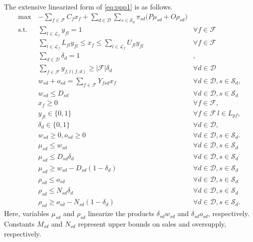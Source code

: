 \documentclass[12pt]{article}
\theoremstyle{thmstylethree}%
\begin{document}
\begin{appendices}
The extensive linearized form of \eqref{eq:ppp1} is as follows.
\begin{subequations}
\begin{align}
\max~&-\sum_{f\in\mathcal{F}}C_{f}x_{f}+\sum_{d\in\mathcal{D}}\sum_{s\in\mathcal{S}_{d}}\pi_{sd}\bigg(P \mu_{sd}+O\rho_{sd}\bigg)\\
\text{s.t. }~&   \sum_{l\in\mathcal{L}_{f}}y_{fl} =1&\forall f\in\mathcal{F}  \\
&   \sum_{l\in\mathcal{L}_{f}}L_{fl}y_{fl} \leq x_{f}\leq \sum_{l\in\mathcal{L}_{f}}U_{fl}y_{fl}&\forall f\in\mathcal{F}\\ 
  & \sum_{d\in\mathcal{D}}\delta_{d} = 1 & , \\
 &\sum_{f\in\mathcal{F}}y_{f,l(f,d)}\geq |\mathcal{F}|\delta_{d} &\forall  d\in \mathcal{D}\\
&w_{sd} + o_{sd}= \sum_{f\in\mathcal{F}}Y_{fsd}x_{f} & \forall  d\in\mathcal{D}, s\in\mathcal{S}_{d}, \\
 &w_{sd}\leq D_{sd}&\forall d\in\mathcal{D}, s\in\mathcal{S}_{d}\\
 & x_{f} \geq 0  &\forall f\in\mathcal{F}, \\ 
 & y_{fl} \in \{0,1\} &\forall f\in\mathcal{F}\, l \in L_{pf}, \\
 & \delta_{d} \in \{0,1\} &\forall d \in \mathcal{D}, \\
 & w_{sd} \geq 0, o_{sd} \geq 0 & \forall d \in \mathcal{D}, s \in \mathcal{S}_{d}. \\
&\mu_{sd}\leq w_{sd}&\forall  d\in\mathcal{D}, s\in\mathcal{S}_{d}\\   
 &\mu_{sd}\leq D_{sd}\delta_{d}&\forall  d\in\mathcal{D}, s\in\mathcal{S}_{d}\\
 &\mu_{sd}\geq w_{sd} - D_{sd}(1-\delta_{d})&\forall d\in\mathcal{D}, s\in\mathcal{S}_{d}\\
 &\rho_{sd}\leq o_{sd}&\forall  d\in\mathcal{D}, s\in\mathcal{S}_{d}\\   
 &\rho_{sd}\leq N_{sd}\delta_{d}&\forall  d\in\mathcal{D}, s\in\mathcal{S}_{d}\\
&\rho_{sd}\geq o_{sd} - N_{sd}(1-\delta_{d})&\forall d\in\mathcal{D}, s\in\mathcal{S}_{d}.
\end{align}
\end{subequations}
Here, variables $\mu_{sd}$ and $\rho_{sd}$ linearize the products $\delta_{sd}w_{sd}$ and $\delta_{sd}o_{sd}$, respectively.
Constants $M_{sd}$ and $N_{sd}$ represent upper bounds on sales and oversupply, respectively. 

\end{appendices}
\end{document}
